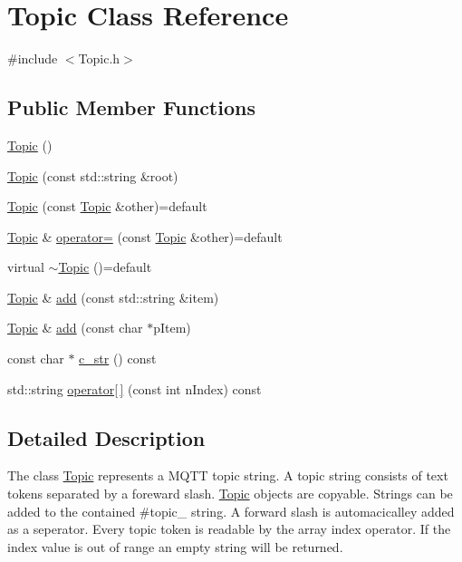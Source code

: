\hypertarget{class_topic}{}\section{Topic Class Reference}
\label{class_topic}


{\ttfamily \#include $<$Topic.\+h$>$}

\subsection*{Public Member Functions}
\begin{DoxyCompactItemize}
\item 
\hyperlink{class_topic_af3301cb0d535eb066a3ea4ed54e28414}{Topic} ()
\item 
\hyperlink{class_topic_a4e2b337c972d1766c80b48e4981eb47f}{Topic} (const std\+::string \&root)
\item 
\hyperlink{class_topic_a5650ccda9f2d99bfd54e90e1f92bc7b2}{Topic} (const \hyperlink{class_topic}{Topic} \&other)=default
\item 
\hyperlink{class_topic}{Topic} \& \hyperlink{class_topic_a744c65ee1c771c392945fe1eba061b7d}{operator=} (const \hyperlink{class_topic}{Topic} \&other)=default
\item 
virtual \hyperlink{class_topic_ad87e9349bbd468750670205498a5417a}{$\sim$\+Topic} ()=default
\item 
\hyperlink{class_topic}{Topic} \& \hyperlink{class_topic_abce06cc663933929b9636f9c3f1e3a39}{add} (const std\+::string \&item)
\item 
\hyperlink{class_topic}{Topic} \& \hyperlink{class_topic_a340aa8d9fa92ad882f72f3fdb333a62a}{add} (const char $\ast$p\+Item)
\item 
const char $\ast$ \hyperlink{class_topic_a8f11bba4553f3294cc6c88b5608965a8}{c\+\_\+str} () const 
\item 
std\+::string \hyperlink{class_topic_a86750eb909dff0a6970dd05ee7e9b8e0}{operator\mbox{[}$\,$\mbox{]}} (const int n\+Index) const 
\end{DoxyCompactItemize}


\subsection{Detailed Description}
The class \hyperlink{class_topic}{Topic} represents a M\+Q\+TT topic string. A topic string consists of text tokens separated by a foreward slash. \hyperlink{class_topic}{Topic} objects are copyable. Strings can be added to the contained \#topic\+\_\+ string. A forward slash is automacicalley added as a seperator. Every topic token is readable by the array index operator. If the index value is out of range an empty string will be returned. 

